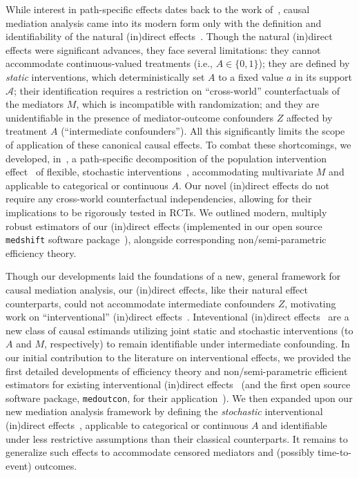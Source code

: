 While interest in path-specific effects dates back to the work
of~\citet{wright1934method}, causal mediation analysis came into its modern form
only with the definition and identifiability of the natural (in)direct
effects~\citep{robins1992identifiability, pearl2001direct}. Though the natural
(in)direct effects were significant advances, they face several limitations:
they cannot accommodate continuous-valued treatments (i.e., $A \in \{0, 1\}$);
they are defined by \textit{static} interventions, which deterministically set
$A$ to a fixed value $a$ in its support $\mathcal{A}$; their identification
requires a restriction on ``cross-world'' counterfactuals of the mediators $M$,
which is incompatible with randomization; and they are unidentifiable in the
presence of mediator-outcome confounders $Z$ affected by treatment $A$
(``intermediate confounders''). All this significantly limits the scope of
application of these canonical causal effects. To combat these shortcomings, we
developed, in~\citet{diaz2020causal}, a path-specific decomposition of the
population intervention effect~\citep{diaz2012population} of flexible,
stochastic interventions~\citep{stock1989nonparametric, diaz2013assessing,
kennedy2019nonparametric}, accommodating multivariate $M$ and applicable to
categorical or continuous $A$. Our novel (in)direct effects do not require any
cross-world counterfactual independencies, allowing for their implications to be
rigorously tested in RCTs. We outlined modern, multiply robust estimators of our
(in)direct effects (implemented in our open source \texttt{medshift} software
package~\citep{hejazi-gh-medshift}), alongside corresponding non/semi-parametric
efficiency theory.

Though our developments laid the foundations of a new, general framework for
causal mediation analysis, our (in)direct effects, like their natural effect
counterparts, could not accommodate intermediate confounders $Z$, motivating
work on ``interventional'' (in)direct effects~\citep{diaz2020nonparametric,
hejazi2020nonparametric}. Inteventional (in)direct
effects~\citep{vanderweele2014effect, vansteelandt2017interventional} are a new
class of causal estimands utilizing joint static and stochastic interventions
(to $A$ and $M$, respectively) to remain identifiable under intermediate
confounding. In our initial contribution to the literature on interventional
effects, we provided the first detailed developments of efficiency theory and
non/semi-parametric efficient estimators for existing interventional (in)direct
effects~\citep{diaz2020nonparametric} (and the first open source software
package, \texttt{medoutcon}, for their application~\citep{hejazi-gh-medoutcon}).
We then expanded upon our new mediation analysis framework by defining the
\textit{stochastic} interventional (in)direct
effects~\citep{hejazi2020nonparametric}, applicable to categorical or continuous
$A$ and identifiable under less restrictive assumptions than their classical
counterparts. It remains to generalize such effects to accommodate censored
mediators and (possibly time-to-event) outcomes.

